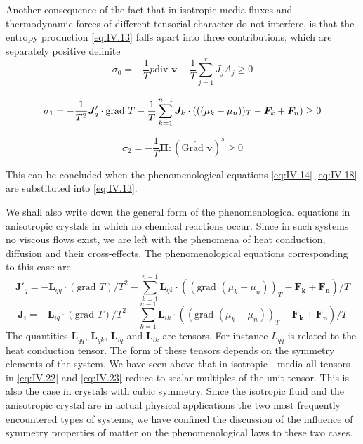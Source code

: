 Another consequence of the fact that in isotropic media fluxes and thermodynamic forces of different tensorial character do not interfere, is that the entropy production \eqref{eq:IV.13} falls apart into three contributions, which are separately positive definite
\begin{equation}
\sigma_0 = -\frac{1}{T} p \textrm{div } \bm{v} - \frac{1}{T} \sum_{j=1}^r J_j A_j \geq 0
    \label{eq:IV.19}
\end{equation}

\begin{equation}
\sigma_1 = - \frac{1}{T^2} \bm{J}'_q \cdot \textrm{grad } T - \frac{1}{T} \sum_{k=1}^{n-1} \bm{J}_k \cdot ((\textrm(\mu_k - \mu_n))_T - \bm{F}_k + \bm{F}_n) \geq 0
\label{eq:IV.20}
\end{equation}

\begin{equation}
\sigma_2 = - \frac{1}{T} \bm{\Pi} : (\mathring{\textrm{Grad } \bm{v}})^s \geq 0
    \label{eq:IV.21}
\end{equation}

This can be concluded when the phenomenological equations \eqref{eq:IV.14}-\eqref{eq:IV.18} are substituted into \eqref{eq:IV.13}.

We shall also write down the general form of the phenomenological equations in anisotropic crystals in which no chemical reactions occur. Since in such systems no viscous flows exist, we are left with the phenomena of heat conduction, diffusion and their cross-effects. The phenomenological equations corresponding to this case are
\begin{equation}
\bm{J}'_q = - \bm{L}_{qq} \cdot (\textrm{grad } T) / T^2 - \sum_{k=1}^{n-1} \bm{L}_{qk} \cdot ((\textrm{grad }(\mu_k - \mu_n))_T - \bm{F_k} + \bm{F_n})/T
    \label{eq:IV.22}
\end{equation}
\begin{equation}
\bm{J}_i = - \bm{L}_{iq} \cdot (\textrm{grad } T) / T^2 - \sum_{k=1}^{n-1} \bm{L}_{ik} \cdot ((\textrm{grad }(\mu_k - \mu_n))_T - \bm{F_k} + \bm{F_n})/T
    \label{eq:IV.23}
\end{equation}
The quantities $\bm{L}_{qq}$, $\bm{L}_{qk}$, $\bm{L}_{iq}$ and $\bm{L}_{ik}$ are tensors. For instance $L_{qq}$ is related to the heat conduction tensor. The form of these tensors depends on the symmetry elements of the system. We have seen above that in isotropic - media all tensors in \eqref{eq:IV.22} and \eqref{eq:IV.23} reduce to scalar multiples of the unit tensor. This is also the case in crystals with cubic symmetry. Since the isotropic fluid and the anisotropic crystal are in actual physical applications the two most frequently encountered types of systems, we have confined the discussion of the influence of symmetry properties of matter on the phenomenological laws to these two cases.

